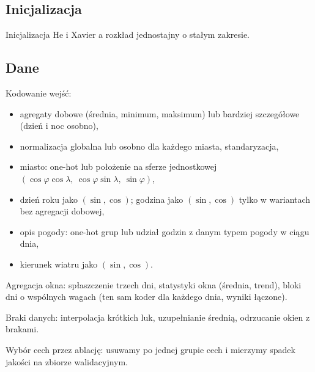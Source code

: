 \documentclass{article}
\begin{document}
\subsection{Inicjalizacja}
\begin{badania}
  \item Inicjalizacja He i Xavier a rozkład jednostajny o stałym zakresie.
\end{badania}

\subsection{Dane}
\begin{badania}
  \item Kodowanie wejść:
    \begin{itemize}
      \item agregaty dobowe (średnia, minimum, maksimum) lub bardziej szczegółowe (dzień i noc osobno),
      \item normalizacja globalna lub osobno dla każdego miasta, standaryzacja,
      \item miasto: one-hot lub położenie na sferze jednostkowej
        $(\cos\varphi\cos\lambda,\ \cos\varphi\sin\lambda,\ \sin\varphi)$,
      \item dzień roku jako $(\sin, \cos)$; godzina jako $(\sin, \cos)$ tylko w wariantach bez agregacji dobowej,
      \item opis pogody: one-hot grup lub udział godzin z danym typem pogody w ciągu dnia,
      \item kierunek wiatru jako $(\sin, \cos)$.
    \end{itemize}
  \item Agregacja okna: spłaszczenie trzech dni, statystyki okna (średnia, trend),
    bloki dni o wspólnych wagach (ten sam koder dla każdego dnia, wyniki łączone).
  \item Braki danych: interpolacja krótkich luk, uzupełnianie średnią, odrzucanie okien z brakami.
  \item Wybór cech przez ablację: usuwamy po jednej grupie cech i mierzymy spadek jakości na zbiorze walidacyjnym.
\end{badania}
\end{document}
